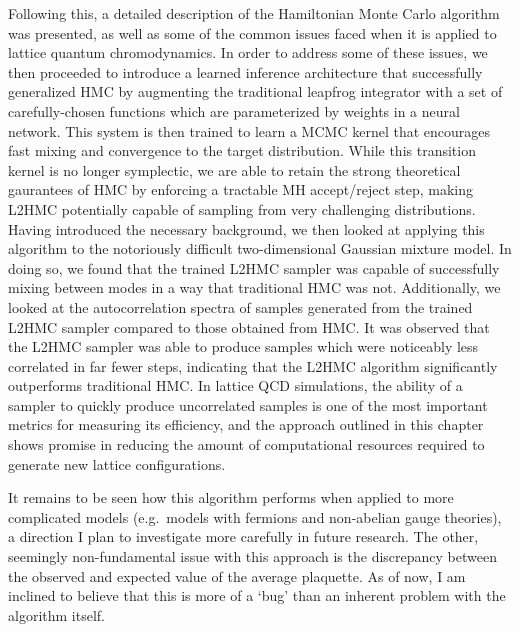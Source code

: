 \documentclass[main.tex]{subfiles}
\begin{document}
Following this, a detailed description of the Hamiltonian Monte Carlo algorithm was presented, as well as some of the
common issues faced when it is applied to lattice quantum chromodynamics.
%
In order to address some of these issues, we then proceeded to introduce a learned inference architecture that
successfully generalized HMC by augmenting the traditional leapfrog integrator with a set of carefully-chosen functions
which are parameterized by weights in a neural network.
%
This system is then trained to learn a MCMC kernel that encourages fast mixing and convergence to the target
distribution.
%
While this transition kernel is no longer symplectic, we are able to retain the strong theoretical gaurantees of HMC by
enforcing a tractable MH accept/reject step, making L2HMC potentially capable of sampling from very challenging
distributions.
%
Having introduced the necessary background, we then looked at applying this algorithm to the notoriously difficult
two-dimensional Gaussian mixture model.
%
In doing so, we found that the trained L2HMC sampler was capable of successfully mixing between modes in a way that
traditional HMC was not.
%
Additionally, we looked at the autocorrelation spectra of samples generated from the trained L2HMC sampler compared to
those obtained from HMC.
%
It was observed that the L2HMC sampler was able to produce samples which were noticeably less correlated in far
fewer steps, indicating that the L2HMC algorithm significantly outperforms traditional HMC.
%
In lattice QCD simulations, the ability of a sampler to quickly produce uncorrelated samples is one of the most
important metrics for measuring its efficiency, and the approach outlined in this chapter shows promise in reducing
the amount of computational resources required to generate new lattice configurations. 


%
%
%
%
%
%
It remains to be seen how this algorithm performs when applied to more complicated models (e.g.\ models with fermions
and non-abelian gauge theories), a direction I plan to investigate more carefully in future research.
%
The other, seemingly non-fundamental issue with this approach is the discrepancy between the observed and expected
value of the average plaquette.
%
As of now, I am inclined to believe that this is more of a `bug' than an inherent problem with the algorithm itself.
\end{document}
